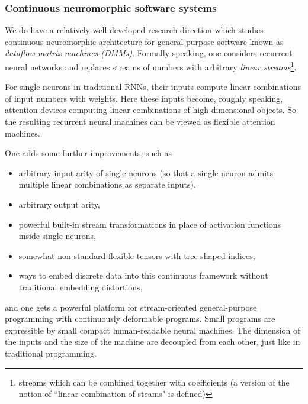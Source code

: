 \documentclass{article}
\begin{document}
\subsubsection{Continuous neuromorphic software systems}

We do have a relatively well-developed research direction which studies continuous neuromorphic architecture
for general-purpose software known as {\em dataflow matrix machines (DMMs)}. Formally speaking, one considers
recurrent neural networks and replaces streams of numbers with arbitrary {\em linear streams}\footnote{streams which can be combined together with coefficients (a version of the notion of ``linear combination of steams" is defined)}.

For single neurons in traditional RNNs, their inputs compute linear combinations of input numbers with weights.
Here these inputs become, roughly speaking, attention devices computing linear combinations of high-dimensional objects.  
So the resulting recurrent neural machines can be viewed as flexible attention machines. 
\vspace{0.0in}

\noindent One adds some further improvements, such as 
\vspace{-0.1in}
\begin{itemize}
 \item arbitrary input arity of single neurons (so that a single neuron admits multiple linear combinations as separate inputs),
 \vspace{-0.1in}
 \item arbitrary output arity, 
 \vspace{-0.1in}
 \item powerful built-in stream transformations in place of activation functions inside single neurons,
 \vspace{-0.1in}
 \item somewhat non-standard flexible tensors with tree-shaped indices, 
 \vspace{-0.1in}
 \item ways to embed discrete data into this continuous framework
without traditional embedding distortions, 
\end{itemize}
\vspace{-0.1in}
and one gets a powerful platform for stream-oriented general-purpose programming
with continuously deformable programs. Small programs are expressible by small compact human-readable neural machines.
The dimension of the inputs and the size of the machine are decoupled from each other, just like in traditional programming.
\end{document}
